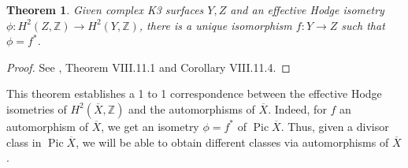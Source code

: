 \documentclass[12pt,twoside]{reedthesis}
\theoremstyle{plain}
\newtheorem{theorem}{Theorem}[chapter]
\theoremstyle{definition}
\theoremstyle{remark}
\newcommand{\ZZ}{\mathbb{Z}}
\newcommand{\Pic}{\operatorname{Pic}}
\begin{document}
\begin{theorem}
Given complex K3 surfaces $Y,Z$ and an effective Hodge isometry $\phi:H^2(Z,\ZZ)\to H^2(Y,\ZZ)$, there is a unique isomorphism $f:Y\to Z$ such that $\phi=f^*$.
\end{theorem}
\begin{proof}
See \cite{vanDeVen}, Theorem VIII.11.1 and Corollary VIII.11.4.
\end{proof}
\noindent This theorem establishes a 1 to 1 correspondence between the effective Hodge isometries of $H^2(\overline{X},\ZZ)$ and the automorphisms of $\overline{X}$. Indeed, for $f$ an automorphism of $\overline{X}$, we get an isometry $\phi=f^*$ of $\Pic\overline{X}$. Thus, given a divisor class in $\Pic\overline{X}$, we will be able to obtain different classes via automorphisms of $\overline{X}$. 
\backmatter 
\nocite{*}



\end{document}
